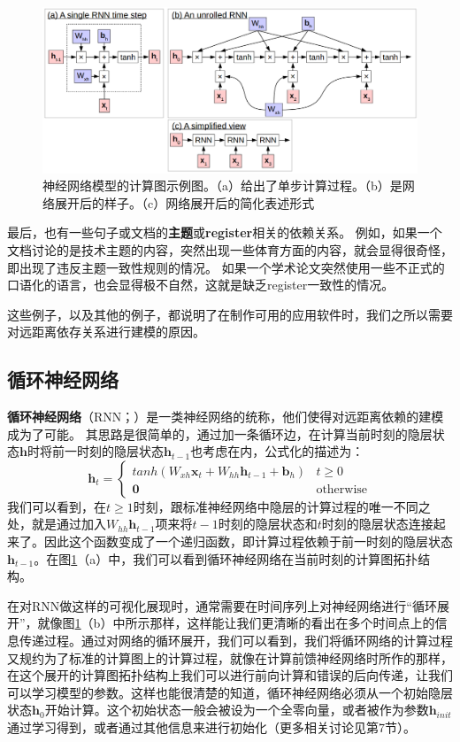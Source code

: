 \documentclass[10pt,a4paper]{ctexart}
\begin{document}
\begin{figure}[H]
\centering
\includegraphics[width=1\textwidth]{fig15.png}
\caption{神经网络模型的计算图示例图。（a）给出了单步计算过程。（b）是网络展开后的样子。（c）网络展开后的简化表述形式}
\label{fig:15}
\end{figure}

最后，也有一些句子或文档的\textbf{主题}或\textbf{register}相关的依赖关系。
例如，如果一个文档讨论的是技术主题的内容，突然出现一些体育方面的内容，就会显得很奇怪，即出现了违反主题一致性规则的情况。
如果一个学术论文突然使用一些不正式的口语化的语言，也会显得极不自然，这就是缺乏register一致性的情况。

这些例子，以及其他的例子，都说明了在制作可用的应用软件时，我们之所以需要对远距离依存关系进行建模的原因。

\subsection{循环神经网络}
\textbf{循环神经网络}（RNN；\cite{elman1990finding}）是一类神经网络的统称，他们使得对远距离依赖的建模成为了可能。
其思路是很简单的，通过加一条循环边，在计算当前时刻的隐层状态$\textbf{h}$时将前一时刻的隐层状态$\textbf{h}_{t-1}$也考虑在内，公式化的描述为：
\[
 \textbf{h}_t = \left\{ \begin{array}{ll}
  tanh(W_{xh}\textbf{x}_t + W_{hh}\textbf{h}_{t-1}+\textbf{b}_h) & t \geq 0 \\
  \textbf{0} & \textrm{otherwise}
  \end{array} \right.
\]
我们可以看到，在$t \geq 1$时刻，跟标准神经网络中隐层的计算过程的唯一不同之处，就是通过加入$W_{hh}\textbf{h}_{t-1}$项来将$t-1$时刻的隐层状态和$t$时刻的隐层状态连接起来了。因此这个函数变成了一个递归函数，即计算过程依赖于前一时刻的隐层状态$\textbf{h}_{t-1}$。在图\ref{fig:15}（a）中，我们可以看到循环神经网络在当前时刻的计算图拓扑结构。

在对RNN做这样的可视化展现时，通常需要在时间序列上对神经网络进行“循环展开”，就像图\ref{fig:15}（b）中所示那样，这样能让我们更清晰的看出在多个时间点上的信息传递过程。通过对网络的循环展开，我们可以看到，我们将循环网络的计算过程又规约为了标准的计算图上的计算过程，就像在计算前馈神经网络时所作的那样，在这个展开的计算图拓扑结构上我们可以进行前向计算和错误的后向传递，让我们可以学习模型的参数。这样也能很清楚的知道，循环神经网络必须从一个初始隐层状态$\textbf{h}_0$开始计算。这个初始状态一般会被设为一个全零向量，或者被作为参数$\textbf{h}_{init}$通过学习得到，或者通过其他信息来进行初始化（更多相关讨论见第7节）。
\end{document}
